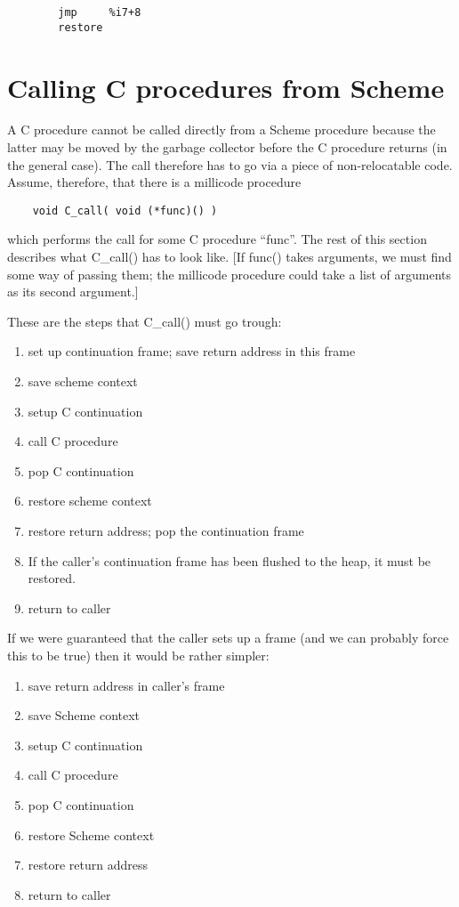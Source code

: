 \begin{verbatim}
        jmp     %i7+8
        restore
\end{verbatim}

\section{Calling C procedures from Scheme}

A C procedure cannot be called directly from a Scheme procedure because 
the latter may be moved by the garbage collector before the C procedure
returns (in the general case). The call therefore has to go via a
piece of non-relocatable code. Assume, therefore, that there is a 
millicode procedure

\begin{verbatim}
    void C_call( void (*func)() )
\end{verbatim}

which performs the call for some C procedure ``func''. The rest of this
section describes what C\_call() has to look like. [If func() takes
arguments, we must find some way of passing them; the millicode
procedure could take a list of arguments as its second argument.]

These are the steps that C\_call() must go trough:

\begin{enumerate}
\item set up continuation frame; save return address in this frame
\item save scheme context
\item setup C continuation
\item call C procedure
\item pop C continuation
\item restore scheme context
\item restore return address; pop the continuation frame
\item If the caller's continuation frame has been flushed to the heap, it
   must be restored.
\item return to caller
\end{enumerate}

If we were guaranteed that the caller sets up a frame (and we can
probably force this to be true) then it would be rather simpler:

\begin{enumerate}
\item save return address in caller's frame
\item save Scheme context
\item setup C continuation
\item call C procedure
\item pop C continuation
\item restore Scheme context
\item restore return address
\item return to caller
\end{enumerate}

